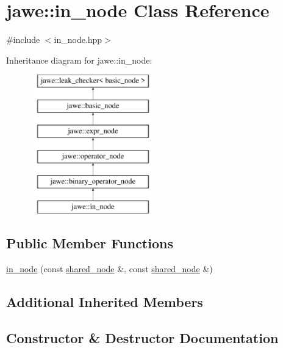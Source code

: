 \hypertarget{classjawe_1_1in__node}{}\section{jawe\+:\+:in\+\_\+node Class Reference}
\label{classjawe_1_1in__node}


{\ttfamily \#include $<$in\+\_\+node.\+hpp$>$}

Inheritance diagram for jawe\+:\+:in\+\_\+node\+:\begin{figure}[H]
\begin{center}
\leavevmode
\includegraphics[height=6.000000cm]{classjawe_1_1in__node}
\end{center}
\end{figure}
\subsection*{Public Member Functions}
\begin{DoxyCompactItemize}
\item 
\hyperlink{classjawe_1_1in__node_acc01a73e6dff6c830c484a914e3d4f06}{in\+\_\+node} (const \hyperlink{namespacejawe_a3f307481d921b6cbb50cc8511fc2b544}{shared\+\_\+node} \&, const \hyperlink{namespacejawe_a3f307481d921b6cbb50cc8511fc2b544}{shared\+\_\+node} \&)
\end{DoxyCompactItemize}
\subsection*{Additional Inherited Members}


\subsection{Constructor \& Destructor Documentation}
\mbox{\label{classjawe_1_1in__node_acc01a73e6dff6c830c484a914e3d4f06}} 
